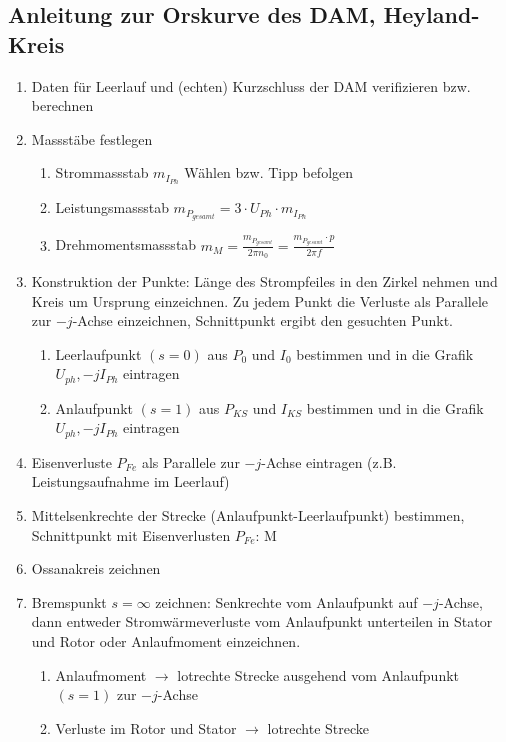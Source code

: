         \newpage
    \subsection{Anleitung zur Orskurve des DAM, Heyland-Kreis}
    \begin{enumerate}
      \item Daten für Leerlauf und (echten) Kurzschluss der DAM verifizieren
      bzw. berechnen
      \item Massstäbe festlegen
      \begin{enumerate}
        \item Strommassstab $m_{I_{Ph}}$ Wählen bzw. Tipp befolgen
        \item Leistungsmassstab $m_{P_{gesamt}}=3\cdot U_{Ph}\cdot m_{I_{Ph}}$
        \item Drehmomentsmassstab $m_M=\frac{m_{P_{gesamt}}}{2\pi n_0} =
        \frac{m_{P_{gesamt}}\cdot p}{2\pi f}$
      \end{enumerate}
      \item Konstruktion der Punkte:
      Länge des Strompfeiles in den Zirkel nehmen und Kreis um Ursprung einzeichnen. Zu jedem Punkt die Verluste als Parallele zur $-j$-Achse einzeichnen, Schnittpunkt ergibt den gesuchten Punkt.
      \begin{enumerate}
      	\item Leerlaufpunkt $(s=0)$ aus $P_0$ und $I_0$ bestimmen und in die Grafik $U_{ph},-jI_{Ph}$ eintragen
        \item Anlaufpunkt $(s=1)$ aus $P_{KS}$ und $I_{KS}$ bestimmen und in die Grafik $U_{ph},-jI_{Ph}$ eintragen
      \end{enumerate}
      \item Eisenverluste $P_{Fe}$ als Parallele zur $-j$-Achse eintragen (z.B. Leistungsaufnahme im Leerlauf)
      \item Mittelsenkrechte der Strecke (Anlaufpunkt-Leerlaufpunkt) bestimmen, Schnittpunkt mit Eisenverlusten $P_{Fe}$: M
      \item Ossanakreis zeichnen
      \item Bremspunkt $s=\infty$ zeichnen: Senkrechte vom Anlaufpunkt auf $-j$-Achse, dann entweder Stromwärmeverluste vom Anlaufpunkt unterteilen in Stator und Rotor oder Anlaufmoment einzeichnen.
      \begin{enumerate}
        \item Anlaufmoment $\rightarrow$ lotrechte Strecke ausgehend vom Anlaufpunkt $(s=1)$ zur $-j$-Achse
        \item Verluste im Rotor und Stator $\rightarrow$ lotrechte Strecke

\end{enumerate}
\end{enumerate}

